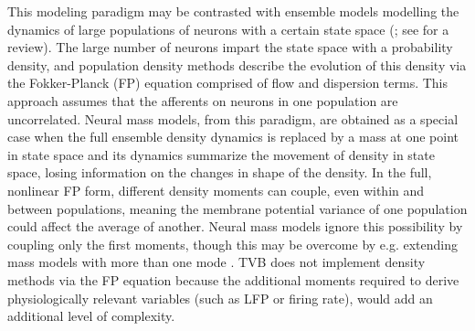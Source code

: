 \documentclass{bioinfo}
\begin{document}
This modeling paradigm may be contrasted with ensemble models modelling the
dynamics of large populations of neurons with a certain state space
(\cite{de1993stochastical, omurtag2000simulation, knight2000dynamics,
gerstner2000population}; see \cite{Deco_2008a} for a review).  The large number
of neurons impart the state space with a probability density, and population
density methods describe the evolution of this density via the Fokker-Planck
(FP) equation \citep{risken1996fokker} comprised of flow and dispersion terms.
This approach assumes that the afferents on neurons in one population are
uncorrelated.  Neural mass models, from this paradigm, are obtained as a
special case when the full ensemble density dynamics is replaced by a mass at
one point in state space and its dynamics summarize the movement of density in
state space, losing information on the changes in shape of the density.  In the
full, nonlinear FP form, different density moments can couple, even within and
between populations, meaning the membrane potential variance of one population
could affect the average of another. Neural mass models ignore this possibility
by coupling only the first moments, though this may be overcome by e.g.
extending mass models with more than one mode \citep{Stefanescu_2008,
Stefanescu_2011}.  TVB does not implement density methods via the FP equation
because the additional moments required to derive physiologically relevant
variables (such as LFP or firing rate), would add an additional level of
complexity.  
\end{document}
